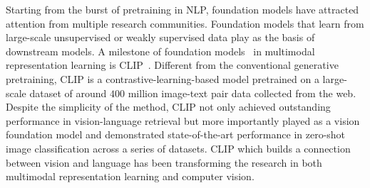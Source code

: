 Starting from the burst of pretraining in NLP, foundation models have attracted attention from multiple research communities. 
Foundation models that learn from large-scale unsupervised or weakly supervised data play as the basis of downstream models. 
A milestone of foundation models~\citep{foundation_model} in multimodal representation learning is CLIP~\cite{clip}. 
Different from the conventional generative pretraining, CLIP is a contrastive-learning-based model pretrained on a large-scale dataset of around $400$ million image-text pair data collected from the web. 
Despite the simplicity of the method, CLIP not only achieved outstanding performance in vision-language retrieval but more importantly played as a vision foundation model and demonstrated state-of-the-art performance in zero-shot image classification across a series of datasets. 
CLIP which builds a connection between vision and language has been transforming the research in both multimodal representation learning and computer vision. 

